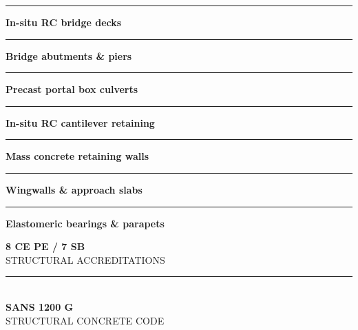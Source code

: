 \documentclass[a4paper,11pt]{article}
\begin{document}
\begin{minipage}[t]{0.34\textwidth}
    \vspace{0pt}
    \begin{tcolorbox}[
        enhanced, colback=mhoffwhite, colframe=mhnavy, boxrule=1pt, arc=4pt,
        title={\bfseries\color{white}\faArchway\ Concrete Scope of Work},
        colbacktitle=mhnavy, left=7pt, right=7pt, top=6pt, bottom=6pt,
        drop shadow=black!6
    ]
        \fontsize{8.1pt}{11.6pt}\selectfont
        \textcolor{mhnavy}{\rule{4pt}{4pt}}\hspace{4pt}\textbf{In-situ RC bridge decks}\\
        \textcolor{mhnavy}{\rule{4pt}{4pt}}\hspace{4pt}\textbf{Bridge abutments \& piers}\\
        \textcolor{mhnavy}{\rule{4pt}{4pt}}\hspace{4pt}\textbf{Precast portal box culverts}\\
        \textcolor{mhnavy}{\rule{4pt}{4pt}}\hspace{4pt}\textbf{In-situ RC cantilever retaining}\\
        \textcolor{mhnavy}{\rule{4pt}{4pt}}\hspace{4pt}\textbf{Mass concrete retaining walls}\\
        \textcolor{mhnavy}{\rule{4pt}{4pt}}\hspace{4pt}\textbf{Wingwalls \& approach slabs}\\
        \textcolor{mhnavy}{\rule{4pt}{4pt}}\hspace{4pt}\textbf{Elastomeric bearings \& parapets}
    \end{tcolorbox}

    \vspace{0.20cm}

    \begin{tcolorbox}[
        enhanced, colback=white, colframe=mhlightgray, boxrule=0.8pt, arc=4pt,
        left=6pt, right=6pt, top=6pt, bottom=6pt, halign=center,
        drop shadow=black!4
    ]
        {\fontsize{18pt}{20pt}\selectfont\bfseries\color{mhblue}8 CE PE / 7 SB}\\[1pt]
        {\fontsize{7.4pt}{9pt}\selectfont\color{mhtextmuted}\MakeUppercase{Structural Accreditations}}\\[4pt]
        \textcolor{mhlightgray}{\rule{3.2cm}{0.6pt}}\\[4pt]
        {\fontsize{13pt}{15pt}\selectfont\bfseries\color{mhnavy}SANS 1200 G}\\[1pt]
        {\fontsize{7.2pt}{9pt}\selectfont\color{mhtextmuted}\MakeUppercase{Structural Concrete Code}}
    \end{tcolorbox}
\end{minipage}
\end{document}

